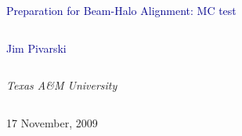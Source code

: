\documentclass[compress]{beamer}
\begin{document}
\begin{frame}
\vfill
\begin{center}
\textcolor{darkblue}{\Large Preparation for Beam-Halo Alignment: MC test}

\vfill
\begin{columns}
\begin{center}
\large
\textcolor{darkblue}{Jim Pivarski}
\end{center}
\end{columns}

\begin{columns}
\begin{center}
\scriptsize
{\it Texas A\&M University}
\end{center}
\end{columns}

\vfill
17 November, 2009

\end{center}
\end{frame}


\small
\end{document}
